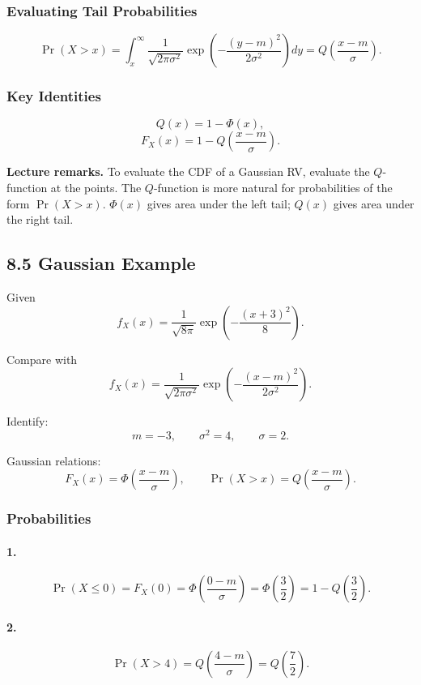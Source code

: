 \documentclass[11pt]{article}
\begin{document}
\subsubsection*{Evaluating Tail Probabilities}

\[
\Pr(X>x)=\int_x^{\infty}
\frac{1}{\sqrt{2\pi\sigma^2}}
\exp\!\left(-\frac{(y-m)^2}{2\sigma^2}\right)dy
=Q\!\left(\frac{x-m}{\sigma}\right).
\]

\subsubsection*{Key Identities}

\[
Q(x)=1-\Phi(x),
\]
\[
F_X(x)=1-Q\!\left(\frac{x-m}{\sigma}\right).
\]

\textbf{Lecture remarks.}
To evaluate the CDF of a Gaussian RV, evaluate the $Q$-function at the points.
The $Q$-function is more natural for probabilities of the form $\Pr(X>x)$.
$\Phi(x)$ gives area under the left tail; $Q(x)$ gives area under the right tail.

\subsection*{8.5 Gaussian Example}

Given
\[
f_X(x)=\frac{1}{\sqrt{8\pi}}
\exp\!\left(-\frac{(x+3)^2}{8}\right).
\]

Compare with
\[
f_X(x)=\frac{1}{\sqrt{2\pi\sigma^2}}
\exp\!\left(-\frac{(x-m)^2}{2\sigma^2}\right).
\]

Identify:
\[
m=-3,\qquad \sigma^2=4,\qquad \sigma=2.
\]

Gaussian relations:
\[
F_X(x)=\Phi\!\left(\frac{x-m}{\sigma}\right),\qquad
\Pr(X>x)=Q\!\left(\frac{x-m}{\sigma}\right).
\]

\subsubsection*{Probabilities}

\paragraph{1.}
\[
\Pr(X\le 0)=F_X(0)
=\Phi\!\left(\frac{0-m}{\sigma}\right)
=\Phi\!\left(\frac{3}{2}\right)
=1-Q\!\left(\frac{3}{2}\right).
\]

\paragraph{2.}
\[
\Pr(X>4)=Q\!\left(\frac{4-m}{\sigma}\right)
=Q\!\left(\frac{7}{2}\right).
\]
\end{document}
